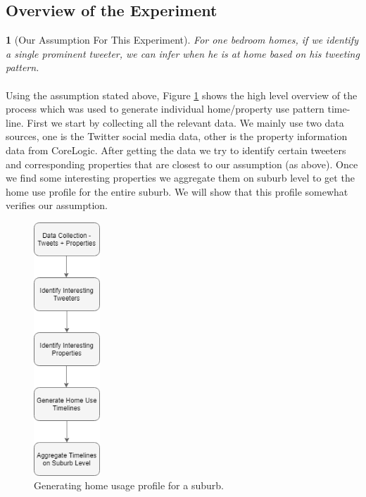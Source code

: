 \documentclass[12pt]{report}
\theoremstyle{named}
\newtheorem*{namedtheorem}{}
\begin{document}
\subsection{Overview of the Experiment}
\label{sec:Overview of the Experiment}
\begin{namedtheorem}[Our Assumption For This Experiment] For one bedroom homes, if we identify a single prominent tweeter, we can infer when he is at home based on his tweeting pattern. 
\end{namedtheorem}
\paragraph{}
Using the assumption stated above, Figure \ref{fig:TimeLineProcess} shows the high level overview of the process which was used to generate individual home/property use pattern time-line. First we start by collecting all the relevant data. We mainly use two data sources, one is the Twitter social media data, other is the property information data from CoreLogic. After getting the data we try to identify certain tweeters and corresponding properties that are closest to our assumption (as above). Once we find some interesting properties we aggregate them on suburb level to get the home use profile for the entire suburb. We will show that this profile somewhat verifies our assumption.
\begin{figure}[ht]
\centering
        \includegraphics[width=25mm,scale=1]{Images/TimeLineProcess.png}
    \caption{Generating home usage profile for a suburb.}
    \label{fig:TimeLineProcess}
\end{figure}
\end{document}
